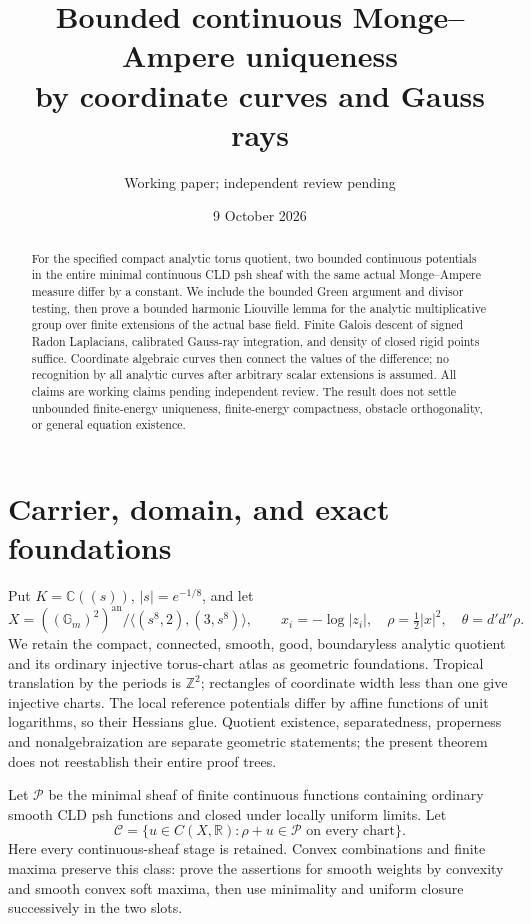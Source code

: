 \documentclass[11pt]{article}
\title{Bounded continuous Monge--Ampere uniqueness\\by coordinate curves and Gauss rays}
\author{Working paper; independent review pending}
\date{9 October 2026}
\newcommand{\DD}{d'd''}
\begin{document}
\maketitle
\begin{abstract}
For the specified compact analytic torus quotient, two bounded
continuous potentials in the entire minimal continuous CLD psh sheaf
with the same actual Monge--Ampere measure differ by a constant.
We include the bounded Green argument and divisor testing, then prove
a bounded harmonic Liouville lemma for the analytic multiplicative
group over finite extensions of the actual base field. Finite Galois
descent of signed Radon Laplacians, calibrated Gauss-ray integration,
and density of closed rigid points suffice. Coordinate algebraic
curves then connect the values of the difference; no recognition by
all analytic curves after arbitrary scalar extensions is assumed.
All claims are working claims pending independent review. The result
does not settle unbounded finite-energy uniqueness, finite-energy
compactness, obstacle orthogonality, or general equation existence.
\end{abstract}

\section{Carrier, domain, and exact foundations}
Put $K=\mathbb C((s))$, $|s|=e^{-1/8}$, and let
\[
 X=((\mathbb G_m)^2)^{\mathrm{an}}/
 \langle(s^8,2),(3,s^8)\rangle,
 \qquad x_i=-\log|z_i|,
 \quad \rho=\tfrac12|x|^2,
 \quad\theta=\DD\rho.
\]
We retain the compact, connected, smooth, good, boundaryless analytic
quotient and its ordinary injective torus-chart atlas as geometric
foundations. Tropical translation by the periods is $\mathbb Z^2$;
rectangles of coordinate width less than one give injective charts.
The local reference potentials differ by affine functions of unit
logarithms, so their Hessians glue. Quotient existence, separatedness,
properness and nonalgebraization are separate geometric statements;
the present theorem does not reestablish their entire proof trees.

Let $\mathscr P$ be the minimal sheaf of finite continuous functions
containing ordinary smooth CLD psh functions and closed under locally
uniform limits. Let
\[
 \mathcal C=\{u\in C(X,\mathbb R):\rho+u\in\mathscr P
                         \text{ on every chart}\}.
\]
Here every continuous-sheaf stage is retained. Convex combinations and
finite maxima preserve this class: prove the assertions for smooth
weights by convexity and smooth convex soft maxima, then use minimality
and uniform closure successively in the two slots.
\end{document}

